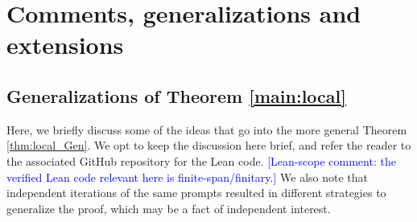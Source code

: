 \documentclass[11pt]{amsart}
\theoremstyle{remark}
\begin{document}
\section{Comments, generalizations and extensions}
\subsection{Generalizations of Theorem \ref{main:local}} Here, we briefly discuss some of the ideas that go into the more general Theorem \ref{thm:local_Gen}. We opt to keep the discussion here brief, and refer the reader to the associated GitHub repository for the Lean code. \textcolor{blue}{[Lean-scope comment: the verified Lean code relevant here is finite-span/finitary.] } We also note that independent iterations of the same prompts resulted in different strategies to generalize the proof, which may be a fact of independent interest.
\end{document}
